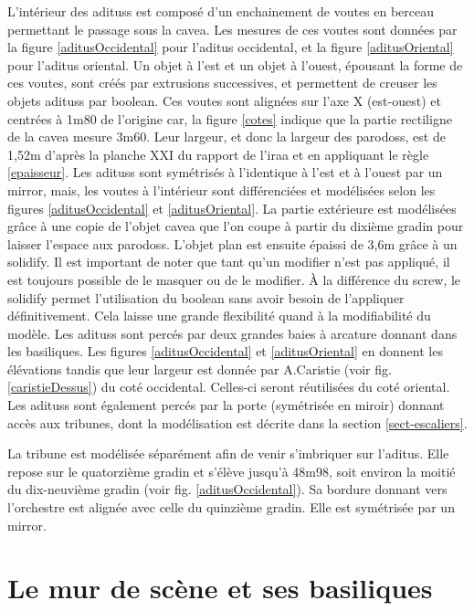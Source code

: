 L'intérieur des \glspl{aditus} est composé d'un enchainement de voutes en berceau permettant le passage sous la \gls{cavea}. Les mesures de ces voutes sont données par la figure \ref{aditusOccidental} pour l'\gls{aditus} occidental, et la figure \ref{aditusOriental} pour l'\gls{aditus} oriental. Un objet à l'est et un objet à l'ouest, épousant la forme de ces voutes, sont créés par extrusions successives, et permettent de creuser les objets \glspl{aditus} par \gls{boolean}. Ces voutes sont alignées sur l'axe X (est-ouest) et centrées à 1m80 de l'origine car, la figure \ref{cotes} indique que la partie rectiligne de la \gls{cavea} mesure 3m60. Leur largeur, et donc la largeur des \glspl{parodos}, est de 1,52m d'après la planche XXI du rapport de l'\gls{iraa}\cite[Pl. XXI]{orangePl} et en appliquant le règle \ref{epaisseur}. Les \glspl{aditus} sont symétrisés à l'identique à l'est et à l'ouest par un \gls{mirror}, mais, les voutes à l'intérieur sont différenciées et modélisées selon les figures \ref{aditusOccidental} et \ref{aditusOriental}. La partie extérieure est modélisées grâce à une copie de l'objet \gls{cavea} que l'on coupe à partir du dixième gradin pour laisser l'espace aux \glspl{parodos}. L'objet plan est ensuite épaissi de 3,6m grâce à un \gls{solidify}. Il est important de noter que tant qu'un \gls{modifier} n'est pas appliqué, il est toujours possible de le masquer ou de le modifier. À la différence du \gls{screw}, le \gls{solidify} permet l'utilisation du \gls{boolean} sans avoir besoin de l'appliquer définitivement. Cela laisse une grande flexibilité quand à la modifiabilité du modèle. Les \glspl{aditus} sont percés par deux grandes baies à arcature donnant dans les basiliques. Les figures \ref{aditusOccidental} et \ref{aditusOriental} en donnent les élévations tandis que leur largeur est donnée par A.Caristie (voir fig. \ref{caristieDessus}) du coté occidental. Celles-ci seront réutilisées du coté oriental. Les \glspl{aditus} sont également percés par la porte (symétrisée en miroir) donnant accès aux tribunes, dont la modélisation est décrite dans la section \ref{sect-escaliers}.

La tribune est modélisée séparément afin de venir s'imbriquer sur l'\gls{aditus}. Elle repose sur le quatorzième gradin et s'élève jusqu'à 48m98, soit environ la moitié du dix-neuvième gradin (voir fig. \ref{aditusOccidental}). Sa bordure donnant vers l'orchestre est alignée avec celle du quinzième gradin. Elle est symétrisée par un \gls{mirror}.

\section{Le mur de scène et ses \glspl{basilique}} 
\label{mur}


